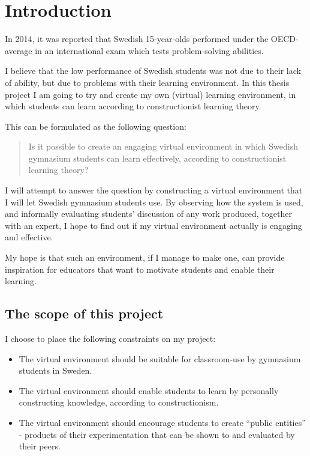 \section{Introduction}

In 2014, it was reported that Swedish 15-year-olds performed under the OECD-average in an international exam which tests problem-solving abilities\cite{skolverket:pisa}.

I believe that the low performance of Swedish students was not due to their lack of ability, but due to problems with their learning environment. In this thesis project I am going to try and create my own (virtual) learning environment, in which students can learn according to constructionist learning theory.

This can be formulated as the following question:
\begin{quote}
Is it possible to create an engaging virtual environment in which Swedish gymnasium students can learn effectively, according to constructionist learning theory?
\end{quote}

I will attempt to answer the question by constructing a virtual environment that I will let Swedish gymnasium students use. By observing how the system is used, and informally evaluating students' discussion of any work produced, together with an expert, I hope to find out if my virtual environment actually is engaging and effective.

My hope is that such an environment, if I manage to make one, can provide inspiration for educators that want to motivate students and enable their learning. 

\subsection{The scope of this project}

I choose to place the following constraints on my project:
\begin{itemize}
  \item The virtual environment should be suitable for classroom-use by gymnasium students in Sweden.
  \item The virtual environment should enable students to learn by personally constructing knowledge, according to constructionism.
  \item The virtual environment should encourage students to create ``public entities'' - products of their experimentation that can be shown to and evaluated by their peers.
\end{itemize}
